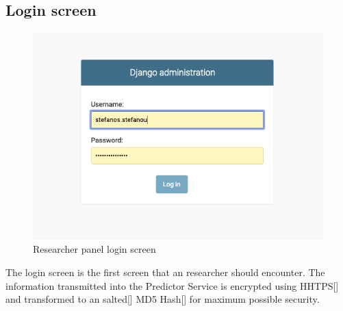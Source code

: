 		\subsection{Login screen}
			\begin{figure}[H]
				\iftrue
				\caption{Researcher panel login screen}
				\centering
				\includegraphics[scale=0.5]{figures/research-panel-login}
				\fi
			\end{figure}
			The login screen is the first screen that an researcher should encounter. The information transmitted into the Predictor
			Service is encrypted using HHTPS[\cite{rfc2818}] and transformed to an salted[\cite{MANBER1996171}] MD5 Hash[\cite{rfc1321}] 
			for maximum possible security. 
